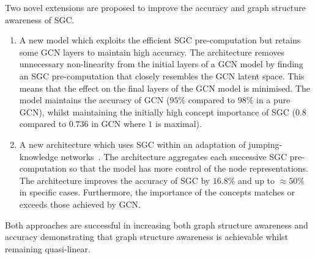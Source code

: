 Two novel extensions are proposed to improve the accuracy and graph structure awareness of SGC.
\begin{enumerate}
    \item
        A new model which exploits the efficient SGC pre-computation but retains some GCN layers to maintain high accuracy.
        The architecture removes unnecessary non-linearity from the initial layers of a GCN model by finding an SGC pre-computation that closely resembles the GCN latent space.
        This means that the effect on the final layers of the GCN model is minimised.
        The model maintains the accuracy of GCN ($95\%$ compared to $98\%$ in a pure GCN), whilst maintaining the initially high concept importance of SGC ($0.8$ compared to $0.736$ in GCN where $1$ is maximal).
    \item
        A new architecture which uses SGC within an adaptation of jumping-knowledge networks~\cite{xu2018representation}.
        The architecture aggregates each successive SGC pre-computation so that the model has more control of the node representations.
        The architecture improves the accuracy of SGC by $16.8\%$ and up to $\approx 50\%$ in specific cases.
        Furthermore, the importance of the concepts matches or exceeds those achieved by GCN.
\end{enumerate}
Both approaches are successful in increasing both graph structure awareness and accuracy demonstrating that graph structure awareness is achievable whilst remaining quasi-linear.

